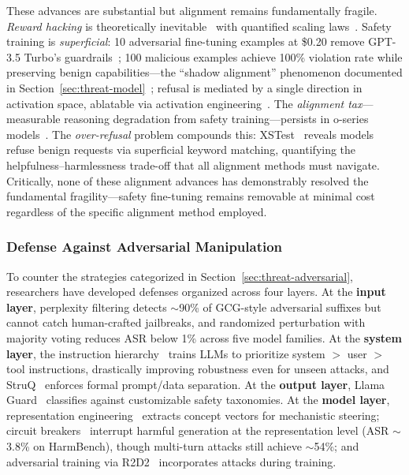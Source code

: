 These advances are substantial but alignment remains fundamentally fragile. \emph{Reward hacking} is theoretically inevitable~\cite{skalse2022rewardhacking} with quantified scaling laws~\cite{gao2023scalinglaws}. Safety training is \emph{superficial}: 10 adversarial fine-tuning examples at \$0.20 remove GPT-3.5 Turbo's guardrails~\cite{qi2024finetuning}; 100 malicious examples achieve 100\% violation rate while preserving benign capabilities---the ``shadow alignment'' phenomenon documented in Section~\ref{sec:threat-model}~\cite{yang2023shadow}; refusal is mediated by a single direction in activation space, ablatable via activation engineering~\cite{arditi2024refusal}. The \emph{alignment tax}---measurable reasoning degradation from safety training---persists in o-series models~\cite{huang2025safetytax}. The \emph{over-refusal} problem compounds this: XSTest~\cite{rottger2024xstest} reveals models refuse benign requests via superficial keyword matching, quantifying the helpfulness--harmlessness trade-off that all alignment methods must navigate. Critically, none of these alignment advances has demonstrably resolved the fundamental fragility---safety fine-tuning remains removable at minimal cost regardless of the specific alignment method employed.


\subsubsection{Defense Against Adversarial Manipulation}
\label{sec:defense}

To counter the strategies categorized in Section~\ref{sec:threat-adversarial}, researchers have developed defenses organized across four layers. At the \textbf{input layer}, perplexity filtering detects $\sim$90\% of GCG-style adversarial suffixes but cannot catch human-crafted jailbreaks, and randomized perturbation with majority voting reduces ASR below 1\% across five model families. At the \textbf{system layer}, the instruction hierarchy~\cite{wallace2024hierarchy} trains LLMs to prioritize system $>$ user $>$ tool instructions, drastically improving robustness even for unseen attacks, and StruQ~\cite{chen2025struq} enforces formal prompt/data separation. At the \textbf{output layer}, Llama Guard~\cite{inan2023llamaguard} classifies against customizable safety taxonomies. At the \textbf{model layer}, representation engineering~\cite{zou2023repe} extracts concept vectors for mechanistic steering; circuit breakers~\cite{zou2024circuitbreakers} interrupt harmful generation at the representation level (ASR $\sim$3.8\% on HarmBench), though multi-turn attacks still achieve $\sim$54\%; and adversarial training via R2D2~\cite{mazeika2024harmbench} incorporates attacks during training.

